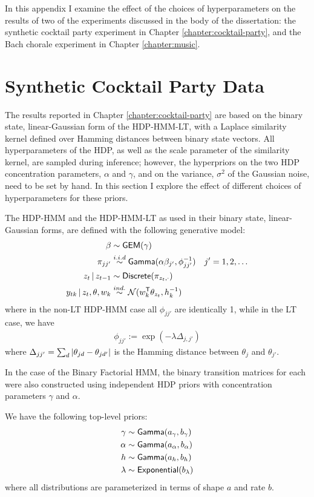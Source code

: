 In this appendix I examine the effect of the choices of
hyperparameters on the results of two of the experiments discussed in
the body of the dissertation: the synthetic cocktail party experiment
in Chapter \ref{chapter:cocktail-party}, and the Bach chorale
experiment in Chapter \ref{chapter:music}.


\section{Synthetic Cocktail Party Data}
The results reported in Chapter \ref{chapter:cocktail-party} are based
on the binary state, linear-Gaussian form of the HDP-HMM-LT, with a
Laplace similarity kernel defined over Hamming distances between
binary state vectors.  All hyperparameters of the HDP, as well as the
scale parameter of the similarity kernel, are sampled during
inference; however, the hyperpriors on the two HDP concentration
parameters, $\alpha$ and $\gamma$, and on the variance, $\sigma^2$ of
the Gaussian noise, need to be set by hand.  In this section I explore
the effect of different choices of hyperparameters for these priors.

The HDP-HMM and the HDP-HMM-LT as used in their binary state, linear-Gaussian forms, are defined with the following generative model:
\begin{align*}
  \beta &\sim \mathsf{GEM}(\gamma) \\
  \pi_{jj'} &\stackrel{i.i.d}{\sim} \mathsf{Gamma}(\alpha\beta_{j'},\phi_{jj'}^{-1}) \quad j' = 1, 2, \dots \\
  z_{t} \, \vert \, z_{t-1} &\sim \mathsf{Discrete}(\pi_{z_t,\cdot}) \\
  y_{tk} \, \vert \, z_t, \theta, w_k &\stackrel{ind.}{\sim} \mathcal{N}(w_k^{\sf T} \theta_{z_t},h_k^{-1})
\end{align*}
where in the non-LT HDP-HMM case all $\phi_{jj'}$ are identically 1, while in the LT case, we have
\begin{align*}
  \phi_{jj'} := \exp(-\lambda \Delta_{j,j'})
\end{align*}
where $\Delta_{jj'} = \sum_{d} \left\vert \theta_{jd} - \theta_{jd'} \right\vert$ 
is the Hamming distance between $\theta_j$ and $\theta_{j'}$.

In the case of the Binary Factorial HMM, the binary transition
matrices for each were also constructed using independent HDP priors
with concentration parameters $\gamma$ and $\alpha$.

We have the following top-level priors:
\begin{align*}
  \gamma &\sim \mathsf{Gamma}(a_{\gamma},b_{\gamma}) \\
  \alpha &\sim \mathsf{Gamma}(a_{\alpha},b_{\alpha}) \\
  h &\sim \mathsf{Gamma}(a_{h},b_{h}) \\
  \lambda &\sim \mathsf{Exponential}(b_{\lambda})
\end{align*}
where all distributions are parameterized in terms of shape $a$ and rate $b$.

